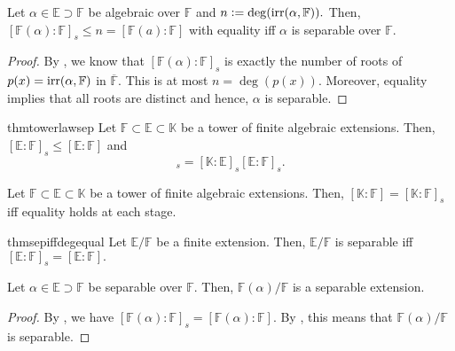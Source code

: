 \begin{prop} \label{prop:sepdeglessthannordeg}
    Let $\alpha \in \mathbb{E} \supset \mathbb{F}$ be algebraic over $\mathbb{F}$ and $n \vcentcolon= \deg(\operatorname{irr}(\alpha, \mathbb{F})).$ Then, $[\mathbb{F}(\alpha) : \mathbb{F}]_s \le n = [\mathbb{F}(a) : \mathbb{F}]$ with equality iff $\alpha$ is separable over $\mathbb{F}.$
\end{prop}
\begin{proof} 
    By , we know that $[\mathbb{F}(\alpha) : \mathbb{F}]_s$ is exactly the number of roots of $p(x) = \operatorname{irr}(\alpha, \mathbb{F})$ in $\overline{\mathbb{F}}.$ This is at most $n = \deg(p(x)).$ Moreover, equality implies that all roots are distinct and hence, $\alpha$ is separable.
\end{proof}

\begin{restatable}{thm}{towerlawsep}
\label{thm:towerlawsep}
    Let $\mathbb{F} \subset \mathbb{E} \subset \mathbb{K}$ be a tower of finite algebraic extensions. Then, $[\mathbb{E} : \mathbb{F}]_s \le [\mathbb{E} : \mathbb{F}]$ and
    \begin{equation*} 
        [\mathbb{K} : \mathbb{F}]_s = [\mathbb{K} : \mathbb{E}]_s [\mathbb{E} : \mathbb{F}]_s.
    \end{equation*} \hfill\hyperref[thm:towerlawsep2]{\downsym}
\end{restatable}

\begin{cor}
    Let $\mathbb{F} \subset \mathbb{E} \subset \mathbb{K}$ be a tower of finite algebraic extensions. Then, $[\mathbb{K} : \mathbb{F}] = [\mathbb{K} : \mathbb{F}]_s$ iff equality holds at each stage.
\end{cor}

\begin{restatable}[]{thm}{sepiffdegequal}
\label{thm:sepiffdegequal}
    Let $\mathbb{E}/\mathbb{F}$ be a finite extension. Then, $\mathbb{E}/\mathbb{F}$ is separable iff $[\mathbb{E} : \mathbb{F}]_s = [\mathbb{E} : \mathbb{F}].$ \hfill\hyperref[thm:sepiffdegequal2]{\downsym}
\end{restatable}

\begin{cor}
    Let $\alpha \in \mathbb{E} \supset \mathbb{F}$ be separable over $\mathbb{F}.$ Then, $\mathbb{F}(\alpha)/\mathbb{F}$ is a separable extension.
\end{cor}
\begin{proof}
    By , we have $[\mathbb{F}(\alpha) : \mathbb{F}]_s = [\mathbb{F}(\alpha) : \mathbb{F}].$ By , this means that $\mathbb{F}(\alpha)/\mathbb{F}$ is separable.
\end{proof}

